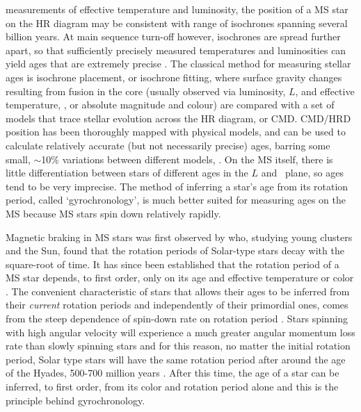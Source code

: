 measurements of effective temperature and luminosity, the position of a MS
star on the HR diagram may be consistent with range of isochrones spanning
several billion years.
At main sequence turn-off however, isochrones are spread further apart, so
that sufficiently precisely measured temperatures and luminosities can yield
ages that are extremely precise \citep[\eg][]{pont2004}.
The classical method for measuring stellar ages is isochrone placement, or
isochrone fitting, where surface gravity changes resulting from fusion in the
core (usually observed via luminosity, $L$, and effective temperature, \teff,
or absolute magnitude and colour) are compared with a set of models that trace
stellar evolution across the HR diagram, or CMD.
CMD/HRD position has been thoroughly mapped with physical models, and can be
used to calculate relatively accurate (but not necessarily precise) ages,
barring some small, $\sim$10\% variations between different models,
\citep[\eg][]{yi2001, dotter2008, dotter2016}.
On the MS itself, there is little differentiation between stars of different
ages in the $L$ and \teff\ plane, so ages tend to be very imprecise.
The method of inferring a star's age from its rotation period, called
`gyrochronology', is much better suited for measuring ages on the MS because
MS stars spin down relatively rapidly.

Magnetic braking in MS stars was first observed by \citet{skumanich1972} who,
studying young clusters and the Sun, found that the rotation periods of
Solar-type stars decay with the square-root of time.
It has since been established that the rotation period of a MS star depends,
to first order, only on its age and effective temperature or color
\citep[\eg][]{barnes2003}.
The convenient characteristic of stars that allows their ages to be inferred
from their {\it current} rotation periods and independently of their
primordial ones, comes from the steep dependence of spin-down rate on rotation
period \citep{kawaler1989}.
Stars spinning with high angular velocity will experience a much greater
angular momentum loss rate than slowly spinning stars and for this reason, no
matter the initial rotation period, Solar type stars will have the same
rotation period after around the age of the Hyades, 500-700 million years
\citep{irwin2009, gallet2015}.
After this time, the age of a star can be inferred, to first order, from its
color and rotation period alone and this is the principle behind
gyrochronology.


